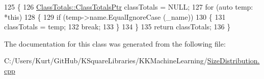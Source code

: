 \begin{DoxyCode}
125   \{
126     \hyperlink{class_size_distribution_1_1_class_totals_a2686de1099514e243ffe29eef7c0ed03}{ClassTotals::ClassTotalsPtr}  classTotals = NULL;
127     \textcolor{keywordflow}{for}  (\textcolor{keyword}{auto} temp: *\textcolor{keyword}{this})
128     \{
129       \textcolor{keywordflow}{if}  (temp->name.EqualIgnoreCase (\_name))
130       \{
131         classTotals = temp;
132         \textcolor{keywordflow}{break};
133       \}
134     \}
135     \textcolor{keywordflow}{return}  classTotals;
136   \}
\end{DoxyCode}


The documentation for this class was generated from the following file\+:\begin{DoxyCompactItemize}
\item 
C\+:/\+Users/\+Kurt/\+Git\+Hub/\+K\+Square\+Libraries/\+K\+K\+Machine\+Learning/\hyperlink{_size_distribution_8cpp}{Size\+Distribution.\+cpp}\end{DoxyCompactItemize}
